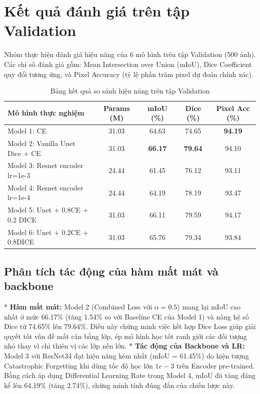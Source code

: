 \documentclass[a4paper,12pt]{report}
\begin{document}
\section{Kết quả đánh giá trên tập Validation}
Nhóm thực hiện đánh giá hiệu năng của 6 mô hình trên tập Validation (500 ảnh). Các chỉ số đánh giá gồm: Mean Intersection over Union (mIoU), Dice Coefficient quy đổi tương ứng, và Pixel Accuracy (tỷ lệ phần trăm pixel dự đoán chính xác).
\begin{table}[H]
\centering
\caption{Bảng kết quả so sánh hiệu năng trên tập Validation}
\label{tab:val_results}
\begin{tabular}{l c c c c}
\toprule
\textbf{Mô hình thực nghiệm} & \textbf{Params (M)} & \textbf{mIoU (\%)} & \textbf{Dice (\%)} & \textbf{Pixel Acc (\%)} \\
\midrule
Model 1: CE & 31.03 & 64.63 & 74.65 & \textbf{94.19} \\
Model 2: Vanilla Unet Dice + CE & 31.03 & \textbf{66.17} & \textbf{79.64} & 94.10 \\
Model 3: Resnet encoder lr=1e-3 & 24.44 & 61.45 & 76.12 & 93.11 \\
Model 4: Resnet encoder lr=1e-4 & 24.44 & 64.19 & 78.19 & 93.47 \\
Model 5: Unet + 0.8CE + 0.2 DICE & 31.03 & 66.11 & 79.59 & 94.17 \\
Model 6: Unet + 0.2CE + 0.8DICE & 31.03 & 65.76 & 79.34 & 93.84 \\
\bottomrule
\end{tabular}
\end{table}

\subsection{Phân tích tác động của hàm mất mát và backbone}
* \textbf{Hàm mất mát:} Model 2 (Combined Loss với $\alpha=0.5$) mang lại mIoU cao nhất ở mức 66.17\% (tăng 1.54\% so với Baseline CE của Model 1) và nâng hệ số Dice từ 74.65\% lên 79.64\%. Điều này chứng minh việc kết hợp Dice Loss giúp giải quyết tốt vấn đề mất cân bằng lớp, ép mô hình học tốt ranh giới các đối tượng nhỏ thay vì chỉ thiên vị các lớp nền lớn.
* \textbf{Tác động của Backbone và LR:} Model 3 với ResNet34 đạt hiệu năng kém nhất (mIoU = 61.45\%) do hiện tượng Catastrophic Forgetting khi dùng tốc độ học lớn $1e-3$ trên Encoder pre-trained. Bằng cách áp dụng Differential Learning Rate trong Model 4, mIoU đã tăng đáng kể lên 64.19\% (tăng 2.74\%), chứng minh tính đúng đắn của chiến lược này.
\end{document}
